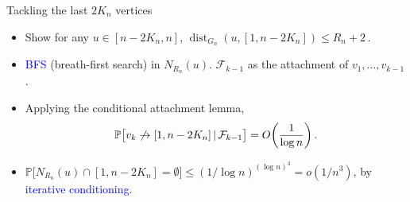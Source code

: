 \documentclass{beamer}
\theoremstyle{plain}
\theoremstyle{definition}
\let\originalleft\left
\let\originalright\right
\renewcommand{\left}{\mathopen{}\mathclose\bgroup\originalleft}
\renewcommand{\right}{\aftergroup\egroup\originalright}
\begin{document}
\begin{frame}{Tackling the last $2K_n$ vertices}
\footnotesize
	\begin{itemize}
		\item Show for any $u\in [n-2K_n,n]$, $\operatorname{dist}_{G_n}(u,[1,n-2K_n])\leq R_n+2\,.$
		\item \textcolor{blue}{BFS} (breath-first search) in $N_{R_n}(u)$.  $\mathcal F_{k-1}$ as the attachment of $v_1,\dots,v_{k-1}$. 
		\item Applying the conditional attachment lemma, $$\mathbb P\big[ v_k \not\to [1,n-2K_n]\,|\,\mathcal F_{k-1}\big]= O\left(\frac{1}{\log n}\right)\,.$$
		\item  $\mathbb P\Big[ N_{R_n}(u)\cap [1,n-2K_n]=\emptyset \Big]\leq (1/\log n)^{(\log n)^3}=o(1/n^3)$, by \textcolor{blue}{iterative conditioning}.
     	\end{itemize}
        
        \vspace{2mm}
    \centering
    
    

\end{frame}
\end{document}
